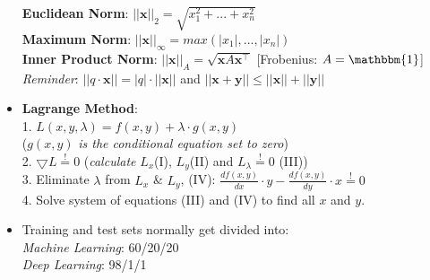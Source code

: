 \documentclass[english]{latex4ei/latex4ei_sheet}
\begin{document}
\begin{itemize}
    \textbf{Euclidean Norm}: $||\mathbf{x}||_2=\sqrt{x_1^2+...+x_n^2}$\\
    \textbf{Maximum Norm}: $||\mathbf{x}||_{\infty}=max(|x_1|,...,|x_n|)$\\
    \textbf{Inner Product Norm}: $||\mathbf{x}||_A=\sqrt{\mathbf{x}A\mathbf{x}^{\top}}$  [Frobenius: $A=\mathbbm{1}$]\\
    \emph{Reminder}: $||q\cdot\mathbf{x}||=|q|\cdot||\mathbf{x}||$ and $||\mathbf{x}+\mathbf{y}||\le||\mathbf{x}||+||\mathbf{y}||$
    \item \textbf{Lagrange Method}:\\
    1. $L(x,y,\lambda)=f(x,y)+\lambda\cdot g(x,y)$ \\($g(x,y)$ \emph{is the conditional equation set to zero})\\
    2. $\bigtriangledown L\overset{!}{=}0$ (\emph{calculate} $L_x$(\textrm{I}), $L_y$(\textrm{II}) and $L_{\lambda}\overset{!}{=}0$ (\textrm{III}))\\
    3. Eliminate $\lambda$ from $L_x$ \& $L_y$, (\textrm{IV}): $\frac{df(x,y)}{dx}\cdot y-\frac{df(x,y)}{dy}\cdot x\overset{!}{=}0$\\
    4. Solve system of equations (\textrm{III}) and (\textrm{IV}) to find all $x$ and $y$.
    \item Training and test sets normally get divided into:\\
    \emph{Machine Learning}: 60/20/20\\
    \emph{Deep Learning}: 98/1/1
\end{itemize}


\newpage
\end{document}
